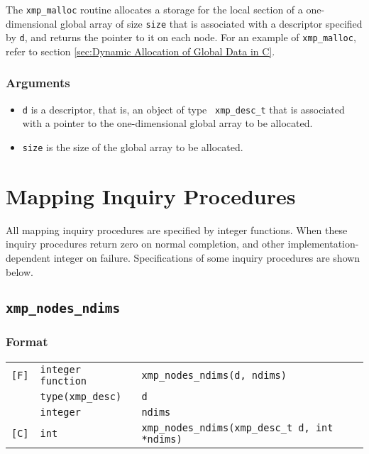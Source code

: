 The {\tt xmp\_malloc} routine allocates a storage for the local section
of a one-dimensional global array of size {\tt size} that is associated
with a descriptor specified by {\tt d}, and returns the pointer to it on
each node. For an example of {\tt xmp\_malloc}, refer to section 
\ref{sec:Dynamic Allocation of Global Data in C}.

\subsubsection*{Arguments}

\begin{itemize}
 \item {\tt d} is a descriptor, that is, an object of type {\tt
       xmp\_desc\_t} that is associated with a pointer to the
       one-dimensional global array to be allocated.
 \item {\tt size} is the size of the global array to be allocated.
\end{itemize}


\section{Mapping Inquiry Procedures}

All mapping inquiry procedures are specified by integer functions. When these inquiry procedures return zero on normal completion, and other implementation-dependent integer on failure. 
Specifications of some inquiry procedures are shown below.

\subsection{\tt xmp\_nodes\_ndims}

\subsubsection*{Format}

\begin{tabular}{lll}

\verb![F]!& {\tt integer function}& {\tt xmp\_nodes\_ndims(d, ndims)}\\
          & {\tt type(xmp\_desc)} & {\tt d}\\
          & {\tt integer} & {\tt ndims}\\

\verb![C]!&  {\tt int}& {\tt xmp\_nodes\_ndims(xmp\_desc\_t d, int *ndims)}\\

\end{tabular}

